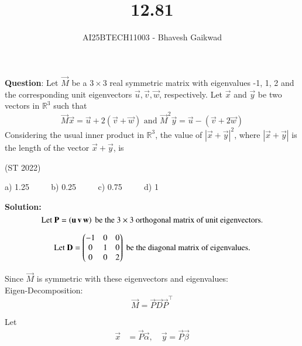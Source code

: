 \documentclass[journal]{IEEEtran}
\begin{document}

\vspace{3cm}

\title{12.81}
\author{AI25BTECH11003 - Bhavesh Gaikwad}
{\let\newpage\relax\maketitle}

\renewcommand{\thefigure}{\theenumi}
\renewcommand{\thetable}{\theenumi}
\setlength{\intextsep}{10pt} 

\renewcommand{\thetable}{\theenumi}


\textbf{Question}: Let $\vec{M}$ be a $3\times3$ real symmetric matrix with eigenvalues -1, 1, 2 and the corresponding unit eigenvectors $\vec{u}, \vec{v},\vec{w}$, respectively. Let $\vec{x}$ and $\vec{y}$ be two vectors in $\mathbb{R}^3$ such that
$$\vec{M}\vec{x} = \vec{u} + 2(\vec{v} + \vec{w}) \text{ and } \vec{M}^2\vec{y} = \vec{u} - (\vec{v} + 2\vec{w})$$
Considering the usual inner product in $\mathbb{R}^3$, the value of $|\vec{x} + \vec{y}|^2$, where $|\vec{x} + \vec{y}|$ is the
length of the vector $\vec{x} + \vec{y}$, is

\hfill{(ST 2022)}

a) 1.25 $\qquad$ b) 0.25 $\qquad$ c) 0.75 $\qquad$ d) 1

\bigskip
 
\textbf{Solution:}\\
\begin{equation}
\text{Let }\mathbf{P} = \left(\mathbf{u} \, \mathbf{v} \, \mathbf{w}\right) \text{ be the $3 \times 3$ orthogonal matrix of unit eigenvectors.}
\end{equation}



\begin{equation}
\text{Let } \mathbf{D} = \begin{pmatrix}-1 & 0 & 0 \\ 0 & 1 & 0 \\ 0 & 0 & 2\end{pmatrix} \text{ be the diagonal matrix of eigenvalues.}
\end{equation}


Since $\vec{M}$ is symmetric with these eigenvectors and eigenvalues:\\
Eigen-Decomposition:
\begin{equation}
\vec{M} = \vec{P}\vec{D}\vec{P}^\top
\end{equation}


Let
\begin{align}
\vec{x} &= \vec{P}\vec{\alpha}, \quad \vec{y} = \vec{P}\vec{\beta}
\end{align}
\end{document}
